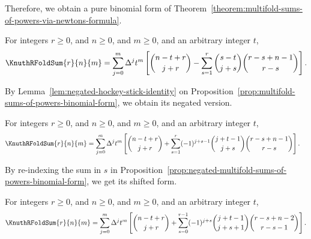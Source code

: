 Therefore, we obtain a pure binomial form
of
Theorem~\eqref{theorem:multifold-sums-of-powers-via-newtons-formula}.

\begin{proposition}
  \label{prop:multifold-sums-of-powers-binomial-form}
  For integers $r\geq 0$, and $n\geq 0$, and $m\geq 0$,
  and an arbitrary integer $t$,
  \begin{align*}
    \KnuthRFoldSum{r}{n}{m}
    = \sum_{j=0}^{m} \Delta^{j} t^{m}
    \left[ \binom{n-t+r}{j+r} -
      \sum_{s=1}^{r} \binom{s-t}{j+s} \binom{r-s+n-1}{r-s}
    \right].
  \end{align*}
\end{proposition}

By Lemma~\eqref{lem:negated-hockey-stick-identity} on
Proposition~\eqref{prop:multifold-sums-of-powers-binomial-form},
we obtain its negated version.

\begin{proposition}
  \label{prop:negated-multifold-sums-of-powers-binomial-form}
  For integers $r\geq 0$, and $n\geq 0$, and $m\geq 0$,
  and an arbitrary integer $t$,
  \begin{align*}
    \KnuthRFoldSum{r}{n}{m}
    &= \sum_{j=0}^{m} \Delta^{j} t^{m}
    \left[ \binom{n-t+r}{j+r} +
      \sum_{s=1}^{r} (-1)^{j+s-1} \binom{j+t-1}{j+s} \binom{r-s+n-1}{r-s}
    \right].
  \end{align*}
\end{proposition}

By re-indexing the sum in $s$ in
Proposition~\eqref{prop:negated-multifold-sums-of-powers-binomial-form},
we get its shifted form.

\begin{proposition}
  \label{prop:negated-multifold-sums-of-powers-binomial-form-reindexed}
  For integers $r\geq 0$, and $n\geq 0$, and $m\geq 0$,
  and an arbitrary integer $t$,
  \begin{align*}
    \KnuthRFoldSum{r}{n}{m}
    = \sum_{j=0}^{m} \Delta^{j} t^{m}
    \left[ \binom{n-t+r}{j+r} +
      \sum_{s=0}^{r-1} (-1)^{j+s} \binom{j+t-1}{j+s+1} \binom{r-s+n-2}{r-s-1}
    \right].
  \end{align*}
\end{proposition}
